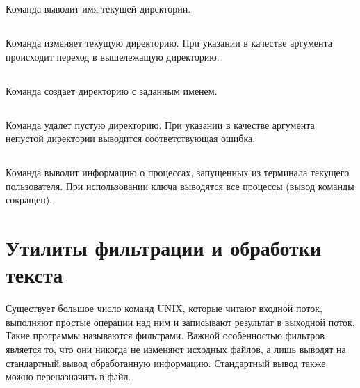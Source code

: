 Команда  выводит имя текущей директории.


\vspace{-1em}
\subsection{}

Команда  изменяет текущую директорию. При указании в качестве аргумента  происходит переход в вышележащую директорию.


\vspace{-1em}
\subsection{}

Команда  создает директорию с заданным именем.


\subsection{}

Команда  удалет пустую директорию. При указании в качестве аргумента непустой директории выводится соответствующая ошибка.


\vspace{-1em}
\subsection{}

Команда  выводит информацию о процессах, запущенных из терминала текущего пользователя. При использовании ключа  выводятся все процессы (вывод команды  сокращен).


\section{Утилиты фильтрации и обработки текста}

Существует большое число команд UNIX, которые читают входной поток, выполняют простые операции над ним и записывают результат в выходной поток. Такие программы называются фильтрами. Важной особенностью фильтров является то, что они никогда не изменяют исходных файлов, а лишь выводят на стандартный вывод обработанную информацию. Стандартный вывод также можно переназначить в файл.

